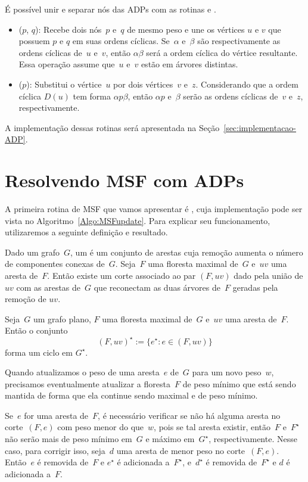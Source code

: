 É possível unir e separar nós das ADPs com as rotinas \LCOMerge{} e \LCOSplit{}.

\begin{itemize}
\item \LCOMerge($p$, $q$): Recebe dois nós~$p$ e~$q$ de mesmo peso e une os vértices $u$ e $v$ que possuem $p$ e $q$ em suas ordens cíclicas.
Se~$\alpha$ e~$\beta$ são respectivamente as ordens cíclicas de~$u$ e~$v$, então $\alpha\beta$ será a ordem cíclica do vértice resultante. 
Essa operação assume que~$u$ e~$v$ estão em árvores distintas.
\item \LCOSplit($p$): Substitui o vértice~$u$ por dois vértices~$v$ e~$z$.
Considerando que a ordem cíclica $D(u)$ tem forma $\alpha p\beta$, então $\alpha p$ e~$\beta$ serão as ordens cíclicas de~$v$ e~$z$, respectivamente.
\end{itemize}


A implementação dessas rotinas será apresentada na Seção~\ref{sec:implementacao-ADP}.


\section{Resolvendo MSF com ADPs}


A primeira rotina de MSF que vamos apresentar é \MSFupdate{}, cuja implementação pode ser vista no Algoritmo~\ref{Algo:MSFupdate}.
Para explicar seu funcionamento, utilizaremos a seguinte definição e resultado.

Dado um grafo~$G$, um  é um conjunto de arestas cuja remoção aumenta o número de componentes conexas de~$G$.
Seja~$F$ uma floresta maximal de~$G$ e~$uv$ uma aresta de~$F$.
Então existe um corte associado ao par $(F, uv)$ dado pela união de $uv$ com as arestas de~$G$ que reconectam as duas árvores de~$F$ geradas pela remoção de $uv$.

\begin{theorem}
\label{teo:cutset}
Seja~$G$ um grafo plano, $F$ uma floresta maximal de~$G$ e~$uv$ uma aresta de~$F$.
Então o conjunto
$$
(F, uv)^\star := \{e^\star:e\in (F, uv)\}
$$
forma um ciclo em $G^\star$.
\end{theorem}

Quando atualizamos o peso de uma aresta~$e$ de~$G$ para um novo peso~$w$, precisamos eventualmente atualizar a floresta~$F$ de peso mínimo que está sendo mantida de forma que ela continue sendo maximal e de peso mínimo.

Se~$e$ for uma aresta de~$F$, é necessário verificar se não há alguma aresta no corte~$(F, e)$ com peso menor do que~$w$, pois se tal aresta existir, então~$F$ e~$F^\star$ não serão mais de peso mínimo em~$G$ e máximo em~$G^\star$, respectivamente.
Nesse caso, para corrigir isso, seja~$d$ uma aresta de menor peso no corte~$(F, e)$.
Então~$e$ é removida de~$F$ e $e^\star$ é adicionada a~$F^\star$, e~$d^\star$ é removida de~$F^\star$ e $d$ é adicionada a~$F$.

